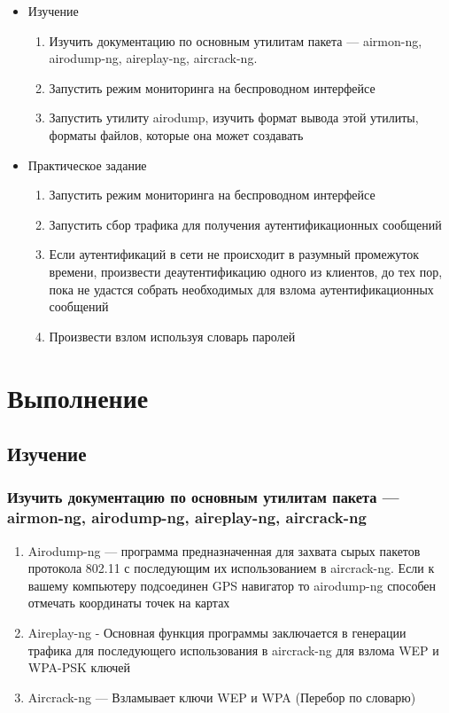 \documentclass[utf8x, 12pt]{G7-32}
\begin{document}
\begin{itemize}

	\item Изучение
	\begin{enumerate}
		\item Изучить документацию по основным утилитам пакета --- airmon-ng, airodump-ng, aireplay-ng, aircrack-ng.

		\item Запустить режим мониторинга на беспроводном интерфейсе
		\item Запустить утилиту airodump, изучить формат вывода этой утилиты, форматы файлов, которые она может создавать
	\end{enumerate}	
	
	\item Практическое задание
		\begin{enumerate}
		\item Запустить режим мониторинга на беспроводном интерфейсе

		\item Запустить сбор трафика для получения аутентификационных сообщений
		
		\item Если аутентификаций в сети не происходит в разумный промежуток времени, произвести деаутентификацию одного из клиентов, до тех пор, пока не удастся собрать необходимых для взлома аутентификационных сообщений
		
		 \item Произвести взлом используя словарь паролей
	\end{enumerate}	
\end{itemize}
	
\chapter{Выполнение}

\section{Изучение}

\subsection{Изучить документацию по основным утилитам пакета --- airmon-ng, airodump-ng, aireplay-ng, aircrack-ng}

\begin{enumerate}
	\item Airodump-ng --- программа предназначенная для захвата сырых пакетов протокола 802.11 с последующим их использованием в aircrack-ng. Если к вашему компьютеру подсоединен GPS навигатор то airodump-ng способен отмечать координаты точек на картах
	
	\item Aireplay-ng - Основная функция программы заключается в генерации трафика для последующего использования в aircrack-ng для взлома WEP и WPA-PSK ключей
	
	\item Aircrack-ng --- Взламывает ключи WEP и WPA (Перебор по словарю)
\end{enumerate}
\end{document}
